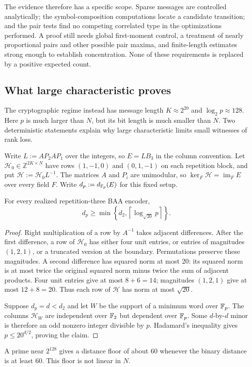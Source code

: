 The evidence therefore has a specific scope.  Sparse messages are controlled
analytically; the symbol-composition computations locate a candidate
transition; and the pair tests find no competing correlated type in the
optimizations performed.  A proof still needs global first-moment control, a
treatment of nearly proportional pairs and other possible pair maxima, and
finite-length estimates strong enough to establish concentration.  None of
these requirements is replaced by a positive expected count.

\subsection{What large characteristic proves}

The cryptographic regime instead has message length $K\approx2^{20}$ and
$\log_2p\approx128$.  Here $p$ is much larger than $N$, but its bit length is
much smaller than $N$.  Two deterministic statements explain why large
characteristic limits small witnesses of rank loss.

Write $L:=AP_2AP_1$ over the integers, so $E=LB_3$ in the
column convention. Let $\mathcal H_0\in\mathbb Z^{2K\times N}$ have rows
$(1,-1,0)$ and $(0,1,-1)$ on each repetition block, and put
$\mathcal H:=\mathcal H_0L^{-1}$. The matrices $A$ and $P_i$ are unimodular,
so $\ker_F \mathcal H=\operatorname{im}_F E$ over every field $F$.
Write $d_p:=d_{\mathbb F_p}(E)$ for this fixed setup.

\begin{proposition}\label{prop:floor}
For every realized repetition-three BAA encoder,
\[
  d_p\ge
  \min\left\{d_2,
    \left\lceil\log_{\sqrt{20}}p\right\rceil\right\}.
\]
\end{proposition}

\begin{proof}
Right multiplication of a row by $A^{-1}$ takes adjacent differences.
After the first difference, a row of $\mathcal H_0$ has either four unit
entries, or entries of magnitudes $(1,2,1)$, or a truncated version at the
boundary.
Permutations preserve these magnitudes. A second difference has squared
norm at most 20: its squared norm is at most twice the original squared
norm minus twice the sum of adjacent products. Four unit entries give
at most $8+6=14$; magnitudes $(1,2,1)$ give at most $12+8=20$.
Thus each row of $\mathcal H$ has norm at most $\sqrt{20}$.

Suppose $d_p=d<d_2$ and let $W$ be the support of a minimum word over $\mathbb F_p$.
The columns $\mathcal H_W$ are independent over $\mathbb F_2$ but dependent over
$\mathbb F_p$.
Some $d$-by-$d$ minor is therefore an odd nonzero integer divisible by $p$.
Hadamard's inequality gives $p\le20^{d/2}$, proving the claim.
\end{proof}
A prime near $2^{128}$ gives a distance floor of about 60 whenever the
binary distance is at least 60. This floor is not linear in $N$.

